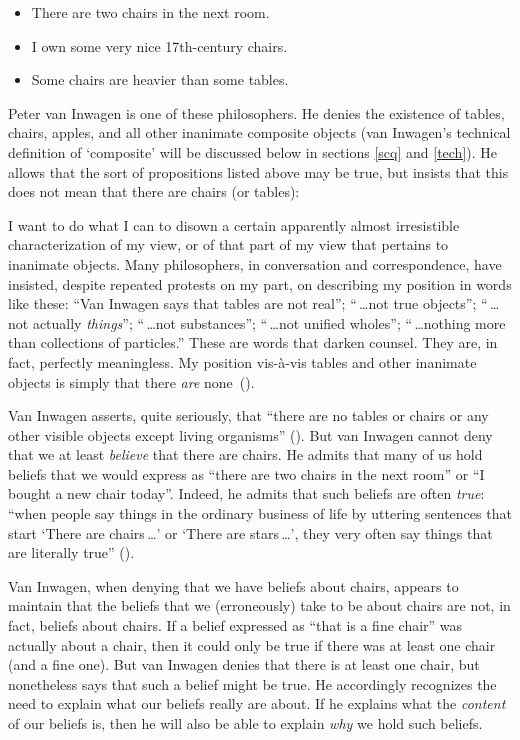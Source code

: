 \documentclass[11pt]{article}
\newenvironment{squote}{%
	\begin{spacing}{1}
	\begin{list}{}{%
	\setlength{\labelwidth}{0pt}%
	\rightmargin\leftmargin%
	}
	\item\relax
	}{%
	\end{list}%
	\end{spacing}
	}
\begin{document}
\begin{spacing}{1.5}
\begin{itemize}
  \item There are two chairs in the next room.
  \item I own some very nice 17th-century chairs.
  \item Some chairs are heavier than some tables.
\end{itemize}

Peter van Inwagen is one of these philosophers.  He denies the
existence of tables, chairs, apples, and all other inanimate composite
objects (van Inwagen's technical definition of `composite' will be
discussed below in sections \ref{scq} and \ref{tech}).  He allows that
the sort of propositions listed above may be true, but insists that
this does not mean that there are chairs (or tables):
\begin{squote}
I want to do what I can to disown a certain apparently almost
irresistible characterization of my view, or of that part of my view
that pertains to inanimate objects.  Many philosophers, in
conversation and correspondence, have insisted, despite repeated
protests on my part, on describing my position in words like these:
``Van Inwagen says that tables are not real''; ``\,\ldots not true
objects''; ``\,\ldots not actually {\em things}''; ``\,\ldots not
substances''; ``\,\ldots not unified wholes''; ``\,\ldots nothing more
than collections of particles.''  These are words that darken counsel.
They are, in fact, perfectly meaningless.  My position vis-\`{a}-vis
tables and other inanimate objects is simply that there {\em are}
none~(\citeyear[99]{inwagen1995}).
\end{squote}

Van Inwagen asserts, quite seriously, that ``there are no tables or
chairs or any other visible objects except living organisms''
(\citeyear[1]{inwagen1995}).  But van Inwagen cannot deny that we at
least {\em believe} that there are chairs.  He admits that many of us
hold beliefs that we would express as ``there are two chairs in the
next room'' or ``I bought a new chair today''.  Indeed, he admits that
such beliefs are often {\em true}: ``when people say things in the
ordinary business of life by uttering sentences that start `There are
chairs\,\ldots ' or `There are stars\,\ldots ', they very often say
things that are literally true'' (\citeyear[102]{inwagen1995}).

Van Inwagen, when denying that we have beliefs about chairs, appears
to maintain that the beliefs that we (erroneously) take to be about
chairs are not, in fact, beliefs about chairs.  If a belief expressed
as ``that is a fine chair'' was actually about a chair, then it could
only be true if there was at least one chair (and a fine one).  But
van Inwagen denies that there is at least one chair, but nonetheless
says that such a belief might be true.  He accordingly recognizes the
need to explain what our beliefs really are about.  If he explains
what the {\em content} of our beliefs is, then he will also be able to
explain {\em why} we hold such beliefs.

\ifstandalone
\end{spacing}


\fi
\end{document}
